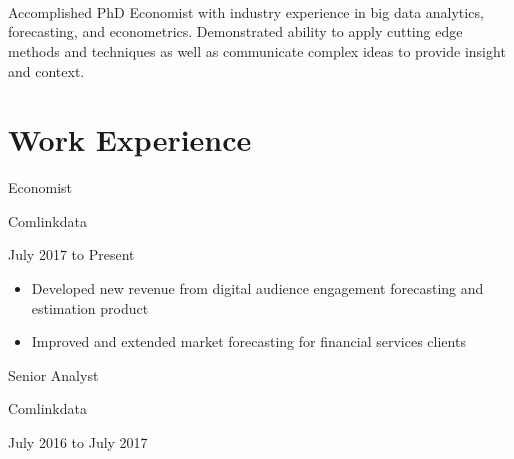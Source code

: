 \documentclass[10pt]{article} %
\begin{document}
\color{text1} %


\begin{minipage}[t]{0.46\textwidth} %

  

\par{}\\
\vspace{16pt} 

\section{}

\vspace{2mm} 

Accomplished PhD Economist with industry experience in big data analytics, forecasting, and econometrics. Demonstrated ability to apply cutting edge methods and techniques as well as communicate complex ideas to provide insight and context.

\vspace{2mm}

\section{Work Experience} 
\vspace{3mm}

{\raggedright \Large Economist} \hfill
{\raggedleft Comlinkdata \\}
{\raggedright \normalsize July 2017 to Present\par}

\small{{\begin{itemize}

\item Developed new revenue from digital audience engagement forecasting and estimation product 
\item Improved and extended market forecasting for financial services clients 

\end{itemize}}}


\vspace{5mm}

{\raggedright \Large Senior Analyst} \hfill
{\raggedleft Comlinkdata \\}
{\raggedright \normalsize July 2016 to July 2017\par}


\end{minipage}
\end{document}

